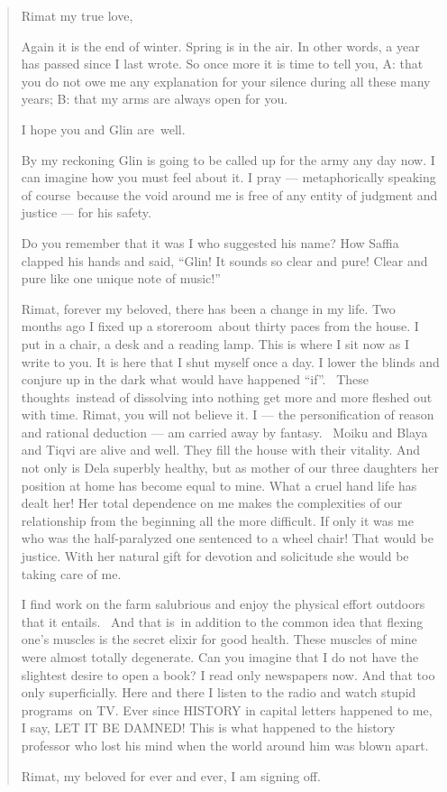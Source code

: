 \documentclass[twoside,11pt,openany]{book}
\begin{document}
\begin{quotation}
Rimat my true love,

Again it is the end of winter. Spring is in the air. In other words,  a year has passed since I last wrote. So once
more it is time to tell you, A: that you do not owe me any explanation for your silence during all these many years;
B: that my arms are always open for you.

I hope you and Glin are~well.

By my reckoning Glin is going to be called up for the army any day now. I can imagine how you must feel about it. I pray
--- metaphorically speaking of course~because the void around me is free of any entity of judgment and justice --- for his
safety.

Do you remember that it was I who suggested his name? How Saffia clapped his hands and said, ``Glin! It
sounds so clear and pure! Clear and pure like one unique {note of music}!''

Rimat, forever my beloved, there has been a change in my life. Two months ago I fixed up a storeroom~about thirty paces
from the house. I put in a chair, a desk and a reading lamp. This is where I sit now as I write to you. It is here that I
shut myself once a day. I lower the blinds and conjure up in the dark what would have happened
``if''.~ These thoughts~instead of dissolving into nothing get more and more fleshed out with
time. Rimat, you will not believe it. I --- the personification of reason and rational deduction --- am carried away by
fantasy.~ Moiku and Blaya and Tiqvi are alive and well. They fill the house with their vitality. And not only is Dela
superbly healthy, but as mother of our three daughters her position at home has become equal to mine. What a cruel hand
life has dealt her! Her total dependence on me makes the complexities of our relationship from the beginning all the
more difficult.  If only it was me who was the half-paralyzed one sentenced to a wheel chair! That would be justice.
With her natural gift for devotion and solicitude she would be taking care of me.

I find work on the farm salubrious and enjoy the physical effort outdoors that it entails.~ And that is~in addition to
the common idea that flexing one's muscles is the secret elixir for good health. These muscles of mine were almost
totally degenerate. Can you imagine that I do not have the slightest desire to open a book? I read only newspapers now.
And that too only superficially. Here and there I listen to the radio and watch stupid programs~on TV. Ever since
HISTORY in capital letters happened to me, I say, LET IT BE DAMNED! This is what happened to the history professor who
lost his mind when the world around him was blown apart.

Rimat, my beloved for ever and ever, I am signing off.
\end{quotation}
\end{document}
